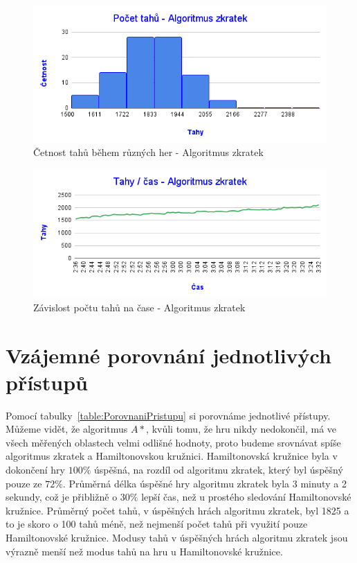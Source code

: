 \begin{figure}[H]
    \centering
    \includegraphics[width=\linewidth]{Images/Počet tahů - Algoritmus zkratek.png}
    \caption{Četnost tahů během různých her - Algoritmus zkratek}
    \label{fig:Počet tahů - Algoritmus zkratek}
\end{figure}

\begin{figure}[H]
    \centering
    \includegraphics[width=\linewidth]{Images/Tahy _ čas - Algoritmus zkratek.png}
    \caption{Závislost počtu tahů na čase - Algoritmus zkratek}
    \label{fig:Tahy _ čas - Algoritmus zkratek}
\end{figure}

\section{Vzájemné porovnání jednotlivých přístupů}
Pomocí tabulky~\ref{table:PorovnaniPristupu} si porovnáme jednotlivé přístupy. Můžeme vidět, že algoritmus \(A*\), kvůli tomu, že hru nikdy nedokončil, má ve všech měřených oblastech velmi odlišné hodnoty, proto budeme srovnávat spíše algoritmus zkratek a Hamiltonovskou kružnici. Hamiltonovská kružnice byla v dokončení hry \(100\%\) úspěšná, na rozdíl od algoritmu zkratek, který byl úspěšný pouze ze \(72\%\). Průměrná délka úspěšné hry algoritmu zkratek byla 3 minuty a 2 sekundy, což je přibližně o \(30\%\) lepší čas, než u prostého sledování Hamiltonovské kružnice. Průměrný počet tahů, v úspěšných hrách algoritmu zkratek, byl 1825 a to je skoro o 100 tahů méně, než nejmenší počet tahů při využití pouze Hamiltonovské kružnice. Modusy tahů v úspěšných hrách algoritmu zkratek jsou výrazně menší než modus tahů na hru u Hamiltonovské kružnice. 

